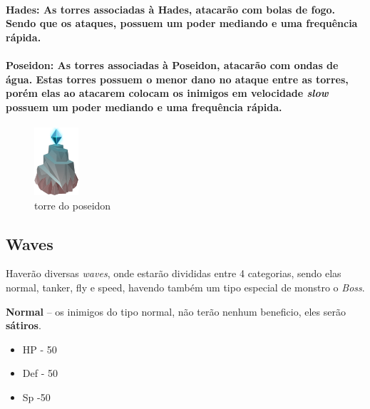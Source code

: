 \documentclass[11pt]{article} %
\begin{document}
\paragraph{{\Large Hades}: As torres associadas à Hades, atacarão com bolas de fogo. Sendo que os ataques, possuem um poder mediando e uma frequência rápida.}

\paragraph{{\Large Poseidon}: As torres associadas à Poseidon, atacarão com ondas de água. Estas torres possuem o menor dano no ataque entre as torres, porém elas ao atacarem colocam os inimigos em velocidade \textit{slow} possuem um poder mediando e uma frequência rápida.}

\begin{figure}[!htp]
\centering
\includegraphics[scale=1.3]{res/characters/poseidon_tower.png}
\caption{torre do poseidon}
\label{satiro}
\end{figure}



\subsection{Waves} 

Haverão diversas \textit{waves}, onde estarão divididas entre 4 categorias, sendo elas normal, tanker, fly e  speed, havendo também um tipo especial de monstro o \textit{Boss}.

\textbf{{ {\large Normal}}} – os inimigos do tipo normal, não terão nenhum beneficio, eles serão \textbf{sátiros}.
\begin{itemize}
\item HP - 50
\item Def - 50
\item Sp -50
\end{itemize}
\end{document}
